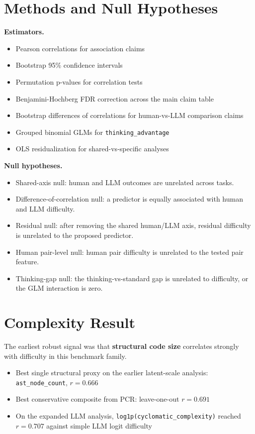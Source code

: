 \documentclass[11pt]{article}
\begin{document}
\section*{Methods and Null Hypotheses}

\textbf{Estimators.}

\begin{itemize}
  \item Pearson correlations for association claims
  \item Bootstrap 95\% confidence intervals
  \item Permutation p-values for correlation tests
  \item Benjamini-Hochberg FDR correction across the main claim table
  \item Bootstrap differences of correlations for human-vs-LLM comparison claims
  \item Grouped binomial GLMs for \texttt{thinking\_advantage}
  \item OLS residualization for shared-vs-specific analyses
\end{itemize}

\textbf{Null hypotheses.}

\begin{itemize}
  \item Shared-axis null: human and LLM outcomes are unrelated across tasks.
  \item Difference-of-correlation null: a predictor is equally associated with human and LLM difficulty.
  \item Residual null: after removing the shared human/LLM axis, residual difficulty is unrelated to the proposed predictor.
  \item Human pair-level null: human pair difficulty is unrelated to the tested pair feature.
  \item Thinking-gap null: the thinking-vs-standard gap is unrelated to difficulty, or the GLM interaction is zero.
\end{itemize}

\section*{Complexity Result}

The earliest robust signal was that \textbf{structural code size} correlates strongly with difficulty in this benchmark family.

\begin{itemize}
  \item Best single structural proxy on the earlier latent-scale analysis: \texttt{ast\_node\_count}, $r = 0.666$
  \item Best conservative composite from PCR: leave-one-out $r = 0.691$
  \item On the expanded LLM analysis, \texttt{log1p(cyclomatic\_complexity)} reached $r = 0.707$ against simple LLM logit difficulty
\end{itemize}
\end{document}
